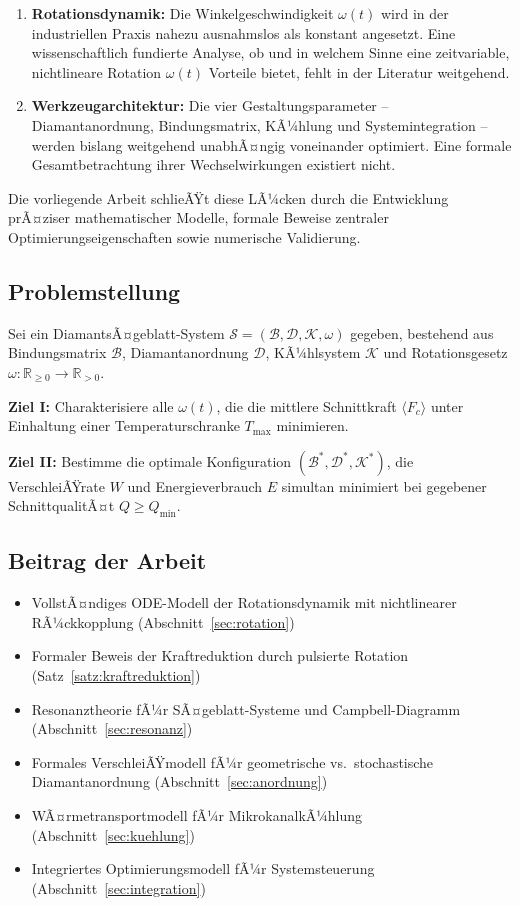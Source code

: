 ﻿\documentclass[a4paper,12pt]{article}
\theoremstyle{definition}
\begin{document}
\begin{enumerate}
\item \textbf{Rotationsdynamik:} Die Winkelgeschwindigkeit $\omega(t)$ wird in der industriellen
      Praxis nahezu ausnahmslos als konstant angesetzt. Eine wissenschaftlich fundierte Analyse,
      ob und in welchem Sinne eine zeitvariable, nichtlineare Rotation $\omega(t)$ Vorteile
      bietet, fehlt in der Literatur weitgehend.
\item \textbf{Werkzeugarchitektur:} Die vier Gestaltungsparameter -- Diamantanordnung, Bindungsmatrix,
      KÃ¼hlung und Systemintegration -- werden bislang weitgehend unabhÃ¤ngig voneinander optimiert.
      Eine formale Gesamtbetrachtung ihrer Wechselwirkungen existiert nicht.
\end{enumerate}

Die vorliegende Arbeit schlieÃŸt diese LÃ¼cken durch die Entwicklung prÃ¤ziser mathematischer Modelle,
formale Beweise zentraler Optimierungseigenschaften sowie numerische Validierung.

\subsection{Problemstellung}

Sei ein DiamantsÃ¤geblatt-System $\mathcal{S} = (\mathcal{B}, \mathcal{D}, \mathcal{K}, \omega)$
gegeben, bestehend aus Bindungsmatrix $\mathcal{B}$, Diamantanordnung $\mathcal{D}$,
KÃ¼hlsystem $\mathcal{K}$ und Rotationsgesetz $\omega: \mathbb{R}_{\geq 0} \to \mathbb{R}_{>0}$.

\textbf{Ziel I:} Charakterisiere alle $\omega(t)$, die die mittlere Schnittkraft $\langle F_c \rangle$
unter Einhaltung einer Temperaturschranke $T_{\max}$ minimieren.

\textbf{Ziel II:} Bestimme die optimale Konfiguration $(\mathcal{B}^*, \mathcal{D}^*, \mathcal{K}^*)$,
die VerschleiÃŸrate $W$ und Energieverbrauch $E$ simultan minimiert bei gegebener SchnittqualitÃ¤t $Q \geq Q_{\min}$.

\subsection{Beitrag der Arbeit}

\begin{itemize}
\item VollstÃ¤ndiges ODE-Modell der Rotationsdynamik mit nichtlinearer RÃ¼ckkopplung (Abschnitt~\ref{sec:rotation})
\item Formaler Beweis der Kraftreduktion durch pulsierte Rotation (Satz~\ref{satz:kraftreduktion})
\item Resonanztheorie fÃ¼r SÃ¤geblatt-Systeme und Campbell-Diagramm (Abschnitt~\ref{sec:resonanz})
\item Formales VerschleiÃŸmodell fÃ¼r geometrische vs.\ stochastische Diamantanordnung (Abschnitt~\ref{sec:anordnung})
\item WÃ¤rmetransportmodell fÃ¼r MikrokanalkÃ¼hlung (Abschnitt~\ref{sec:kuehlung})
\item Integriertes Optimierungsmodell fÃ¼r Systemsteuerung (Abschnitt~\ref{sec:integration})
\end{itemize}
\end{document}
